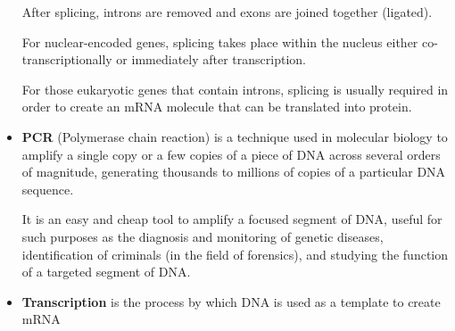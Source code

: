 \begin{itemize}
After splicing, introns are removed and exons are joined together (ligated).

For nuclear-encoded genes, splicing takes place within the nucleus either
co-transcriptionally or immediately after transcription.

For those eukaryotic genes that contain introns, splicing is usually required
in order to create an mRNA molecule that can be translated into protein.
	\item \textbf{PCR} (Polymerase chain reaction) is a technique used in
molecular biology to amplify a single copy or a few copies of a piece of DNA
across several orders of magnitude, generating thousands to millions of copies
of a particular DNA sequence.

It is an easy and cheap tool to amplify a focused segment of DNA, useful for
such purposes as the diagnosis and monitoring of genetic diseases,
identification of criminals (in the field of forensics), and studying the
function of a targeted segment of DNA.
	\item \textbf{Transcription} is the process by which DNA is used as a
template to create mRNA
\end{itemize}
